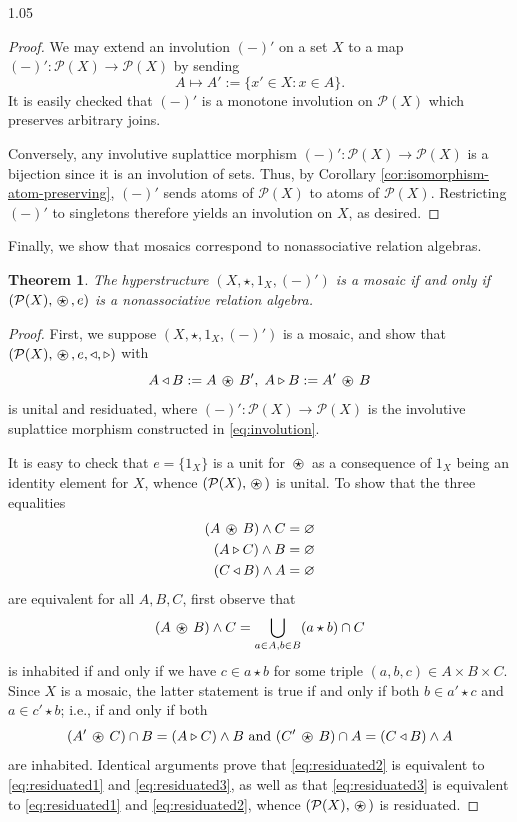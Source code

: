 \documentclass[reqno]{amsart}
\newcommand{\ostar}{%
  \mathbin{%
    \tikz[baseline=(s.base)]{
      \node (s) at (0,0) {$\star$};
      \draw[line width=0.4pt] (s.center) circle[radius=0.82ex];
    }%
  }%
}
\newcommand{\pow}{\mathcal{P}}
\numberwithin{equation}{section}
\theoremstyle{plain}
\newtheorem{theorem}[equation]{Theorem}
\theoremstyle{definition}
\begin{document}
\begin{spacing}{1.05}
\begin{proof}
    We may extend an involution $(-)'$ on a set $X$ to a map $(-)' : \pow(X) \to \pow(X)$ by sending \begin{equation} \label{eq:involution} A \mapsto A' := \{x' \in X : x \in A\}.\end{equation} It is easily checked that $(-)'$ is a monotone involution on $\pow(X)$ which preserves arbitrary joins.

    Conversely, any involutive suplattice morphism $(-)': \pow(X) \to \pow(X)$ is a bijection since it is an involution of sets. Thus, by Corollary \ref{cor:isomorphism-atom-preserving}, $(-)'$ sends atoms of $\pow(X)$ to atoms of $\pow(X)$. Restricting $(-)'$ to singletons therefore yields an involution on $X$, as desired.
\end{proof}

Finally, we show that mosaics correspond to nonassociative relation algebras.

\begin{theorem} \label{thm:is-relation-algebra}
    The hyperstructure $(X,\star,1_X,(-)')$ is a mosaic if and only if $(\pow(X),\ostar,e)$ is a nonassociative relation algebra.
\end{theorem}

\begin{proof} First, we suppose $(X,\star,1_X,(-)')$ is a mosaic, and show that $(\pow(X),\ostar,e,\triangleleft, \triangleright)$ with $$ A \triangleleft B := A \ostar B', \; A \triangleright B := A' \ostar B $$ is unital and residuated, where $(-)' : \pow(X) \to \pow(X)$ is the involutive suplattice morphism constructed in \ref{eq:involution}. 

It is easy to check that $e = \{1_X\}$ is a unit for $\ostar$ as a consequence of $1_X$ being an identity element for $X$, whence $(\pow(X),\ostar)$ is unital. To show that the three equalities \begin{align} \label{eq:residuated1} (A \ostar B) \land C &= \varnothing \\ \label{eq:residuated2}
        (A \triangleright C) \land B & = \varnothing \\ \label{eq:residuated3}
        (C \triangleleft B) \land A &= \varnothing \end{align} are equivalent for all $A,B,C$, first observe that $$(A \ostar B) \land C = \bigcup_{a \in A, b \in B} (a \star b) \cap C $$ is inhabited if and only if we have $c \in a \star b$ for some triple $(a,b,c) \in A \times B \times C$. Since $X$ is a mosaic, the latter statement is true if and only if both $b \in a' \star c$ and $a \in c' \star b$; i.e., if and only if both $$(A' \ostar C) \cap B = (A \triangleright C) \land B \text{ and } (C' \ostar B) \cap A = (C \triangleleft B) \land A$$ are inhabited. Identical arguments prove that \ref{eq:residuated2} is equivalent to \ref{eq:residuated1} and \ref{eq:residuated3}, as well as that \ref{eq:residuated3} is equivalent to \ref{eq:residuated1} and \ref{eq:residuated2}, whence $(\pow(X), \ostar)$ is residuated.


\end{proof}
\end{spacing}
\end{document}
